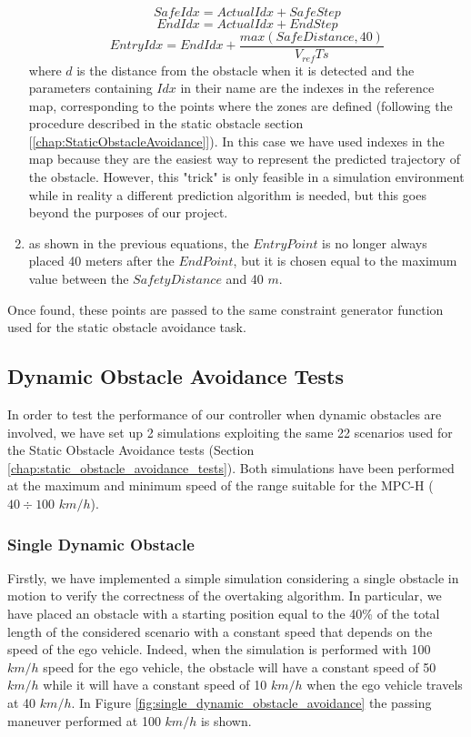 \begin{enumerate}
\begin{equation}
            SafeIdx = ActualIdx+SafeStep
    \end{equation}
    \begin{equation}
            EndIdx = ActualIdx+EndStep
    \end{equation}
    \begin{equation}
            EntryIdx = EndIdx+\frac{max(SafeDistance,40)}{V_{ref}Ts}   
    \end{equation}
    where $d$ is the distance from the obstacle when it is detected and the parameters containing $Idx$ in their name are the indexes in the reference map, corresponding to the points where the zones are defined (following the procedure described in the static obstacle section [\ref{chap:StaticObstacleAvoidance}]).
    In this case we have used indexes in the map because they are the easiest way to represent the predicted trajectory of the obstacle. However, this "trick" is only feasible in a simulation environment while in reality a different prediction algorithm is needed, but this goes beyond the purposes of our project.
    \item as shown in the previous equations, the $EntryPoint$ is no longer always placed 40 meters after the $EndPoint$, but it is chosen equal to the maximum value between the $Safety Distance$ and 40 $m$.
\end{enumerate}
Once found, these points are passed to the same constraint generator function used for the static obstacle avoidance task.

\subsection{Dynamic Obstacle Avoidance Tests}
In order to test the performance of our controller when dynamic obstacles are involved, we have set up 2 simulations exploiting the same 22 scenarios used for the Static Obstacle Avoidance tests (Section \ref{chap:static_obstacle_avoidance_tests}). Both simulations have been performed at the maximum and minimum speed of the range suitable for the MPC-H ($40\div100$  $km/h$).  

\subsubsection{Single Dynamic Obstacle}
Firstly, we have implemented a simple simulation considering a single obstacle in motion to verify the correctness of the overtaking algorithm. In particular, we have placed an obstacle with a starting position equal to the 40\% of the total length of the considered scenario with a constant speed that depends on the speed of the ego vehicle. Indeed, when the simulation is performed with 100 $km/h$ speed for the ego vehicle, the obstacle will have a constant speed of 50 $km/h$ while it will have a constant speed of 10 $km/h$ when the ego vehicle travels at 40 $km/h$. In Figure \ref{fig:single_dynamic_obstacle_avoidance} the passing maneuver performed at 100 $km/h$ is shown.

